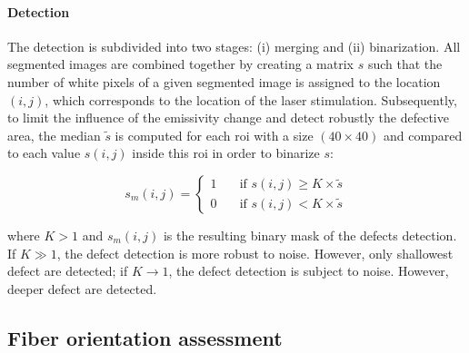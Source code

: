 \paragraph{Detection} The detection is subdivided into two stages: (i) merging and (ii) binarization.
All segmented images are combined together by creating a matrix $s$ such that the number of white pixels of a given segmented image is assigned to the location $(i,j)$, which corresponds to the location of the laser stimulation.
Subsequently, to limit the influence of the emissivity change and detect robustly the defective area, the median $\tilde{s}$ is computed for each \ac{roi} with a size $(40\times40)$ and compared to each value $s(i,j)$ inside this \ac{roi} in order to binarize $s$:

\begin{equation}
  \label{eq:3}
s_m(i,j) = \begin{cases}
1 & \quad \text{if } s(i,j) \geq K \times \tilde{s}\\
0 & \quad \text{if } s(i,j) < K \times \tilde{s}
\end{cases}
\end{equation}

\noindent where $K > 1$ and $s_m(i,j)$ is the resulting binary mask of the defects detection.
If $K \gg 1$, the defect detection is more robust to noise. However, only shallowest defect are detected; if $K \to 1$, the defect detection is subject to noise. However, deeper defect are detected.


\subsection{Fiber orientation assessment}\label{subsec:32}



